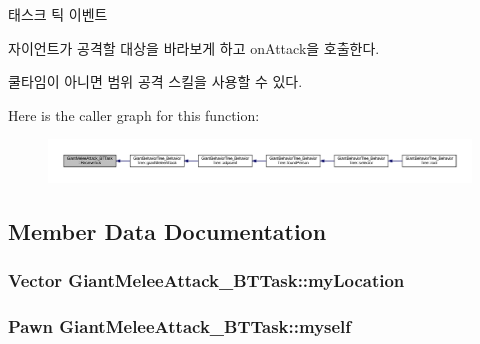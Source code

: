 태스크 틱 이벤트 

자이언트가 공격할 대상을 바라보게 하고 on\+Attack을 호출한다.

쿨타임이 아니면 범위 공격 스킬을 사용할 수 있다. 

Here is the caller graph for this function\+:\nopagebreak
\begin{figure}[H]
\begin{center}
\leavevmode
\includegraphics[width=350pt]{class_giant_melee_attack___b_t_task_ab61144023115cd885efb224bdd6e4f05_icgraph}
\end{center}
\end{figure}




\subsection{Member Data Documentation}
\subsubsection[{\texorpdfstring{my\+Location}{myLocation}}]{\setlength{\rightskip}{0pt plus 5cm}Vector Giant\+Melee\+Attack\+\_\+\+B\+T\+Task\+::my\+Location\hspace{0.3cm}{\ttfamily [private]}}\hypertarget{class_giant_melee_attack___b_t_task_a6d7cb8d701fc5a62d10180592a1727bf}{}\label{class_giant_melee_attack___b_t_task_a6d7cb8d701fc5a62d10180592a1727bf}
\subsubsection[{\texorpdfstring{myself}{myself}}]{\setlength{\rightskip}{0pt plus 5cm}Pawn Giant\+Melee\+Attack\+\_\+\+B\+T\+Task\+::myself\hspace{0.3cm}{\ttfamily [private]}}\hypertarget{class_giant_melee_attack___b_t_task_a30dd53d02e844eab55652c2fc628b53c}{}\label{class_giant_melee_attack___b_t_task_a30dd53d02e844eab55652c2fc628b53c}
